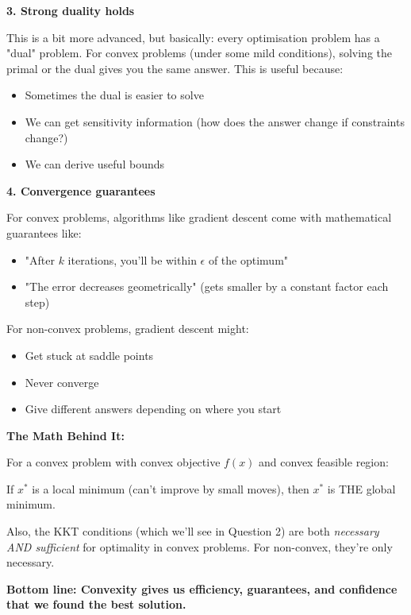 \documentclass[11pt]{article}
\newenvironment{answerbox}
  {\begin{framed}\begin{center}\large\bfseries}
  {\end{center}\end{framed}}
\begin{document}
\vspace{0.5em}

\textbf{3. Strong duality holds}

This is a bit more advanced, but basically: every optimisation problem has a "dual" problem. For convex problems (under some mild conditions), solving the primal or the dual gives you the same answer. This is useful because:
\begin{itemize}
\item Sometimes the dual is easier to solve
\item We can get sensitivity information (how does the answer change if constraints change?)
\item We can derive useful bounds
\end{itemize}

\vspace{0.5em}

\textbf{4. Convergence guarantees}

For convex problems, algorithms like gradient descent come with mathematical guarantees like:
\begin{itemize}
\item "After $k$ iterations, you'll be within $\epsilon$ of the optimum"
\item "The error decreases geometrically" (gets smaller by a constant factor each step)
\end{itemize}

For non-convex problems, gradient descent might:
\begin{itemize}
\item Get stuck at saddle points
\item Never converge
\item Give different answers depending on where you start
\end{itemize}

\vspace{0.5em}

\textbf{The Math Behind It:}

For a convex problem with convex objective $f(x)$ and convex feasible region:

If $x^*$ is a local minimum (can't improve by small moves), then $x^*$ is THE global minimum.

Also, the KKT conditions (which we'll see in Question 2) are both \textit{necessary AND sufficient} for optimality in convex problems. For non-convex, they're only necessary.

\begin{answerbox}
\textbf{Bottom line:} Convexity gives us efficiency, guarantees, and confidence that we found the best solution.
\end{answerbox}
\end{document}
